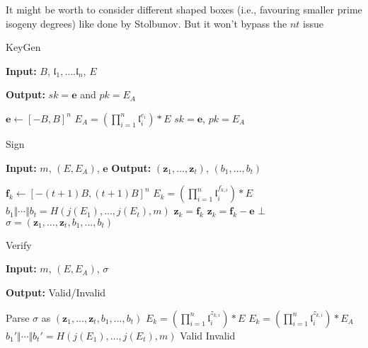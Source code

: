 \documentclass{llncs}
\renewcommand{\a}{\mathfrak{a}}
\renewcommand{\b}{\mathfrak{b}}
\renewcommand{\l}{\mathfrak{l}}
\newcommand{\e}{\textbf{e}}
\newcommand{\f}{\textbf{f}}
\newcommand{\z}{\textbf{z}}
\begin{document}
It might be worth to consider different shaped boxes (i.e., favouring smaller prime isogeny degrees) like done by Stolbunov. But it won't bypass the $nt$ issue




%
%

\begin{algorithm}[H]
	\caption{KeyGen \label{alg:KeyGen}}
	\textbf{Input:} $B$, $\l_1, \dots. \l_n$, $E$

	\textbf{Output:} $sk =\e$ and $pk = E_A$

	\begin{algorithmic}[1]
		\State $\e \leftarrow [-B,B]^n$ 
		\State $E_A = ( \prod_{i=1}^n \l_i^{e_i} ) * E$
		\State \Return $sk= \e$, $pk = E_A$
	\end{algorithmic}
\end{algorithm}

\begin{algorithm}[H]
	\caption{Sign \label{alg:Sign}}
	\textbf{Input:} $m$, $(E,E_A)$, $\e$
	\textbf{Output:} $(\z_1, \dots, \z_t)$, $(b_1 , \dots, b_t)$
	\begin{algorithmic}[1]
		\State $\f_k \leftarrow [-(t+1)B,(t+1)B]^n$ 
		\State $E_k = ( \prod_{i=1}^n \l_i^{f_{k,i}} ) * E$
		\EndFor
		\State $b_1 \Vert \cdots \Vert b_t = H( j(E_1) , \dots, j(E_t), m )$
		\State $\z_k = \f_k$
		\Else
		\State $\z_k = \f_k - \e$
		\EndIf
		\If{$\z_{k} \not\in [-tB,tB]^n$} \State \Return $\bot$ \EndIf
		\EndFor
		\State \Return $\sigma = (\z_1, \dots, \z_t, b_1 , \dots, b_t)$
	\end{algorithmic}
\end{algorithm}

\begin{algorithm}[H]
	\caption{Verify \label{alg:Verify}}
	\textbf{Input:} $m$, $(E,E_A)$, $\sigma$

	\textbf{Output:} Valid/Invalid

	\begin{algorithmic}[1]
		\State Parse $\sigma$ as $(\z_1, \dots, \z_t, b_1 , \dots, b_t)$
		\State $E_k = ( \prod_{i=1}^n \l_i^{z_{k,i}} ) * E$
		\Else
		\State $E_k = ( \prod_{i=1}^n \l_i^{z_{k,i}} ) * E_A$
		\EndIf
		\EndFor
		\State $b_1' \Vert \cdots \Vert b_t' = H( j(E_1) , \dots, j(E_t), m )$
		 \State \Return Valid
		\Else \State \Return Invalid \EndIf
	\end{algorithmic}
\end{algorithm}
\end{document}
